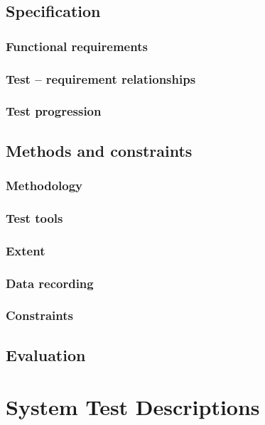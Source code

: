 \documentclass[12pt]{report}
\begin{document}
\section{Specification}
\subsection{Functional requirements}
\subsection{Test -- requirement relationships}
\subsection{Test progression}

\section{Methods and constraints}
\subsection{Methodology}
\subsection{Test tools}
\subsection{Extent}
\subsection{Data recording}
\subsection{Constraints}

\section{Evaluation}

%
%

\chapter{System Test Descriptions}
\end{document}

